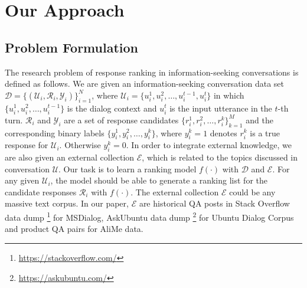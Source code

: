 

\section{Our Approach}
\subsection{Problem Formulation}
The research problem of response ranking in information-seeking conversations is defined as follows. We are given an information-seeking conversation data set $\mathcal{D} = \{(\mathcal{U}_i, \mathcal{R}_i,  \mathcal{Y}_i)\}_{i=1}^N$, where $ \mathcal{U}_i = \{u_i^1, u_i^2, \dots, u_i^{t-1} , u_i^t\} $ in which $ \{u_i^1, u_i^2, \dots, u_i^{t-1}\} $ is the dialog context and $u_i^t$ is the  input utterance in the $t$-th turn. $\mathcal{R}_i$ and $\mathcal{Y}_i$ are a set of response candidates $ \{r_i^1, r_i^2, \dots, r_{i}^k\}_{k=1}^M $ and the corresponding binary labels $ \{y_i^1, y_i^2, \dots, y_{i}^k\} $, where $y_i^k=1$ denotes $r_i^k$ is a true response for $\mathcal{U}_i$. Otherwise $y_i^k=0$. In order to integrate external knowledge, we are also given an external collection  $\mathcal{E}$, which is related to the topics discussed in conversation $\mathcal{U}$. Our task is to learn a ranking model $f(\cdot)$ with $\mathcal{D}$ and $\mathcal{E}$. For any given $\mathcal{U}_i$, the model should be able to generate a ranking list for the candidate responses $\mathcal{R}_i$ with $f(\cdot)$.  The external collection $\mathcal{E}$ could be any massive text corpus. In our paper, $\mathcal{E}$ are historical QA posts in Stack Overflow data dump \footnote{\url{https://stackoverflow.com/}} for MSDialog, AskUbuntu data dump  \footnote{\url{https://askubuntu.com/}} for Ubuntu Dialog Corpus and product QA pairs for AliMe data. %

